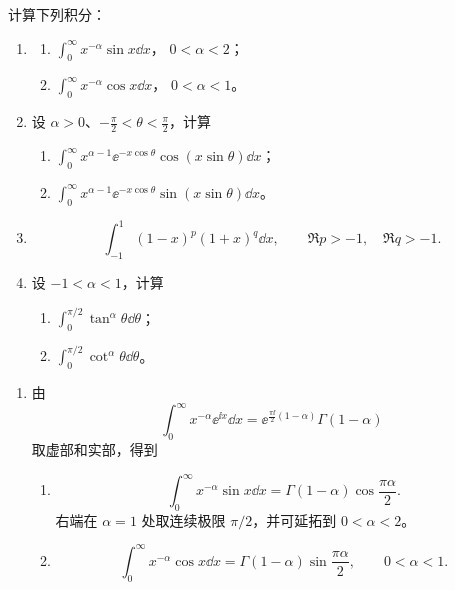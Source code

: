 \begin{question}
计算下列积分：
\begin{enumerate}
  \item
  \begin{enumerate}
    \item \(\displaystyle\int_0^\infty x^{-\alpha}\sin x\dd{x}\)，
    \(0<\alpha<2\)；
    \item \(\displaystyle\int_0^\infty x^{-\alpha}\cos x\dd{x}\)，
    \(0<\alpha<1\)。
  \end{enumerate}

  \item 设 \(\alpha>0\)、\(-\frac{\pi}{2}<\theta<\frac{\pi}{2}\)，计算
  \begin{enumerate}
    \item
    \(\displaystyle\int_0^\infty
    x^{\alpha-1}\ee^{-x\cos\theta}\cos(x\sin\theta)\dd{x}\)；
    \item
    \(\displaystyle\int_0^\infty
    x^{\alpha-1}\ee^{-x\cos\theta}\sin(x\sin\theta)\dd{x}\)。
  \end{enumerate}

  \item
  \[
  \int_{-1}^{1}(1-x)^p(1+x)^q\dd{x},
  \qquad \Re p>-1,\quad \Re q>-1.
  \]

  \item 设 \(-1<\alpha<1\)，计算
  \begin{enumerate}
    \item \(\displaystyle\int_0^{\pi/2}\tan^\alpha\theta\dd{\theta}\)；
    \item \(\displaystyle\int_0^{\pi/2}\cot^\alpha\theta\dd{\theta}\)。
  \end{enumerate}
\end{enumerate}
\begin{solution}
\begin{enumerate}
  \item 由
  \[
  \int_0^\infty x^{-\alpha}\ee^{\ii x}\dd{x}
  =\ee^{\frac{\pi\ii}{2}(1-\alpha)}\Gamma(1-\alpha)
  \]
  取虚部和实部，得到
  \begin{enumerate}
    \item
    \[
    \int_0^\infty x^{-\alpha}\sin x\dd{x}
    =\Gamma(1-\alpha)\cos\frac{\pi\alpha}{2}.
    \]
    右端在 \(\alpha=1\) 处取连续极限 \(\pi/2\)，并可延拓到
    \(0<\alpha<2\)。
    \item
    \[
    \int_0^\infty x^{-\alpha}\cos x\dd{x}
    =\Gamma(1-\alpha)\sin\frac{\pi\alpha}{2},
    \qquad 0<\alpha<1.
    \]
  \end{enumerate}


\end{enumerate}
\end{solution}
\end{question}
